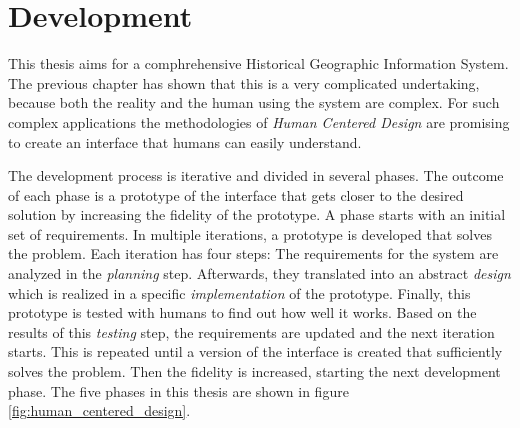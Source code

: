 


\chapter{Development} %
\label{cha:development}

This thesis aims for a comphrehensive Historical Geographic Information System. The previous chapter has shown that this is a very complicated undertaking, because both the reality and the human using the system are complex. For such complex applications the methodologies of \emph{Human Centered Design} are promising to create an interface that humans can easily understand.

The development process is iterative and divided in several phases. The outcome of each phase is a prototype of the interface that gets closer to the desired solution by increasing the fidelity of the prototype. A phase starts with an initial set of requirements. In multiple iterations, a prototype is developed that solves the problem. Each iteration has four steps: The requirements for the system are analyzed in the \emph{planning} step. Afterwards, they translated into an abstract \emph{design} which is realized in a specific \emph{implementation} of the prototype. Finally, this prototype is tested with humans to find out how well it works. Based on the results of this \emph{testing} step, the requirements are updated and the next iteration starts. This is repeated until a version of the interface is created that sufficiently solves the problem. Then the fidelity is increased, starting the next development phase. The five phases in this thesis are shown in figure \ref{fig:human_centered_design}.


